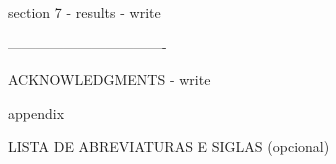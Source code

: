 section 7 - results
- write

----------------------------------

ACKNOWLEDGMENTS
- write

appendix

LISTA DE ABREVIATURAS E SIGLAS (opcional)
